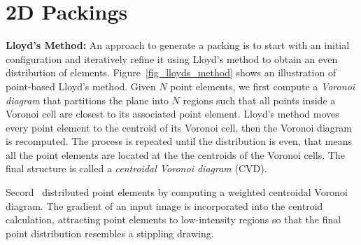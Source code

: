 \section{2D Packings}


\newtext
{
\textbf{Lloyd's Method:}
An approach to generate a packing is to start with an initial configuration and iteratively refine it using Lloyd's method
to obtain an even distribution of elements. 
Figure~\ref{fig_lloyds_method} shows an illustration of point-based Lloyd's method.
Given $N$ point elements, 
we first compute a \textit{Voronoi diagram} that partitions the plane into $N$ regions such that
all points inside a Voronoi cell are closest to its associated point element.
Lloyd's method moves every point element to the centroid of its Voronoi cell, 
then the Voronoi diagram is recomputed.
The process is repeated until the distribution is even,
that means all the point elements are located at the the centroids of the Voronoi cells.
The final structure is called a \textit{centroidal Voronoi diagram} (CVD).
}

\newtext
{
Secord~\cite{Secord2002} distributed point elements by computing a weighted centroidal Voronoi diagram.
The gradient of an input image is incorporated into the centroid calculation, 
attracting point elements to low-intensity regions so that
the final point distribution resembles a stippling drawing.
}


